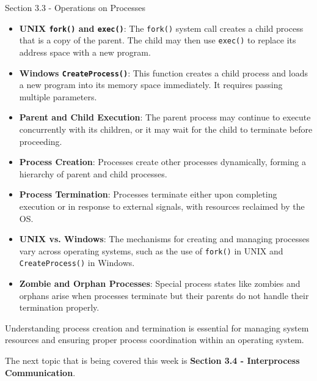 \begin{notes}{Section 3.3 - Operations on Processes}
\begin{highlight}
        \begin{itemize}
            \item \textbf{UNIX \texttt{fork()} and \texttt{exec()}}: The \texttt{fork()} system call creates a child process that is a copy of the parent. The child may then use \texttt{exec()} to 
            replace its address space with a new program.
            \item \textbf{Windows \texttt{CreateProcess()}}: This function creates a child process and loads a new program into its memory space immediately. It requires passing multiple parameters.
            \item \textbf{Parent and Child Execution}: The parent process may continue to execute concurrently with its children, or it may wait for the child to terminate before proceeding.
        \end{itemize}
    
    \end{highlight}
    
    \begin{highlight}
    
        \begin{itemize}
            \item \textbf{Process Creation}: Processes create other processes dynamically, forming a hierarchy of parent and child processes.
            \item \textbf{Process Termination}: Processes terminate either upon completing execution or in response to external signals, with resources reclaimed by the OS.
            \item \textbf{UNIX vs. Windows}: The mechanisms for creating and managing processes vary across operating systems, such as the use of \texttt{fork()} in UNIX and \texttt{CreateProcess()} in Windows.
            \item \textbf{Zombie and Orphan Processes}: Special process states like zombies and orphans arise when processes terminate but their parents do not handle their termination properly.
        \end{itemize}
    
    Understanding process creation and termination is essential for managing system resources and ensuring proper process coordination within an operating system.
    
    \end{highlight}
\end{notes}

The next topic that is being covered this week is \textbf{Section 3.4 - Interprocess Communication}.

